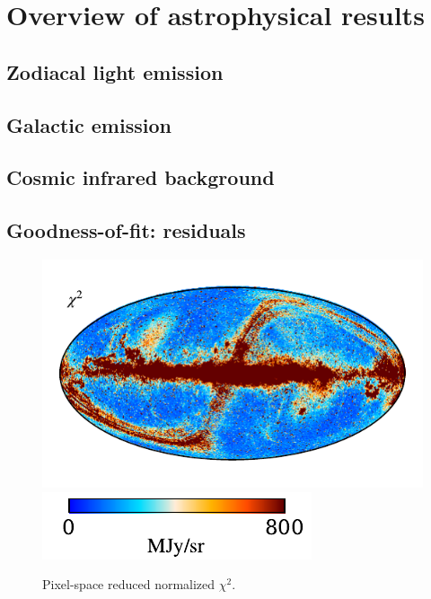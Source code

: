 \documentclass{aa}
\begin{document}
\clearpage
\section{Overview of astrophysical results}
\subsection{Zodiacal light emission}
\subsection{Galactic emission}
\subsection{Cosmic infrared background}
\subsection{Goodness-of-fit: residuals}


\begin{figure}
	\centering
	\includegraphics{figs/chisq_c0001_000019.pdf}
	\includegraphics{figs/chisq_cbar_c0001_000019.pdf}
	\caption{Pixel-space reduced normalized $\chi^2$.}
	\label{fig:chisq}
\end{figure}
\end{document}
